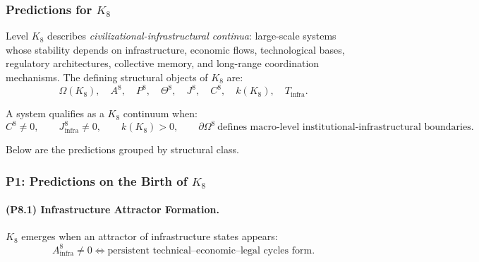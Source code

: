 

\subsubsection{Predictions for \texorpdfstring{$K_8$}{K_8}}
\label{sec:predictions-k8}

Level $K_8$ describes \emph{civilizational-infrastructural continua}: 
large-scale systems whose stability depends on infrastructure, 
economic flows, technological bases, regulatory architectures, 
collective memory, and long-range coordination mechanisms.  
The defining structural objects of $K_8$ are:
\[
\Omega(K_8),\quad A^{8},\quad P^{8},\quad \Theta^{8},\quad 
J^{8},\quad C^{8},\quad k(K_8),\quad T_{\mathrm{infra}}.
\]

A system qualifies as a $K_8$ continuum when:
\[
C^{8} \neq 0,\qquad 
J^{8}_{\mathrm{infra}} \neq 0,\qquad
k(K_8) > 0,\qquad
\partial\Omega^{8} \ \text{defines macro-level institutional-infrastructural boundaries}.
\]

Below are the predictions grouped by structural class.

\subsubsection{P1: Predictions on the Birth of \texorpdfstring{$K_8$}{K_8}}

\paragraph{(P8.1) Infrastructure Attractor Formation.}
$K_8$ emerges when an attractor of infrastructure states appears:
\[
A_{\mathrm{infra}}^8 \neq 0 
\iff 
\text{persistent technical–economic–legal cycles form}.
\]

